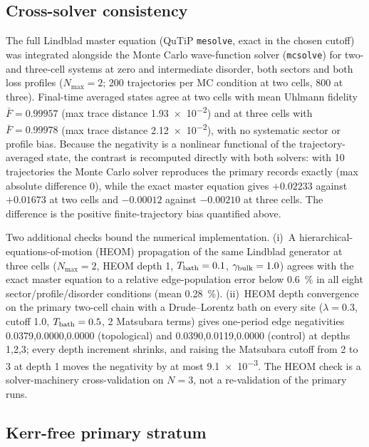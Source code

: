 \documentclass[aps,pra,preprint,superscriptaddress,amsmath,amssymb]{revtex4-2}
\begin{document}
\subsection{Cross-solver consistency}
\label{sec:crosssolver}

The full Lindblad master equation (QuTiP \texttt{mesolve}, exact in the chosen cutoff) was integrated alongside the Monte Carlo wave-function solver (\texttt{mcsolve}) for two- and three-cell systems at zero and intermediate disorder, both sectors and both loss profiles ($N_{\max}=\num{2}$; \num{200} trajectories per MC condition at two cells, \num{800} at three). Final-time averaged states agree at two cells with mean Uhlmann fidelity $\bar{F}=\num{0.99957}$ (max trace distance \num{1.93e-2}) and at three cells with $\bar{F}=\num{0.99978}$ (max trace distance \num{2.12e-2}), with no systematic sector or profile bias. Because the negativity is a nonlinear functional of the trajectory-averaged state, the contrast is recomputed directly with both solvers: with \num{10} trajectories the Monte Carlo solver reproduces the primary records exactly (max absolute difference $\num{0}$), while the exact master equation gives $+\num{0.02233}$ against $+\num{0.01673}$ at two cells and $-\num{0.00012}$ against $-\num{0.00210}$ at three cells. The difference is the positive finite-trajectory bias quantified above.

Two additional checks bound the numerical implementation. (i)~A hierarchical-equations-of-motion (HEOM) propagation of the same Lindblad generator at three cells ($N_{\max}=\num{2}$, HEOM depth \num{1}, $T_{\rm bath}=\num{0.1}$, $\gamma_{\rm bulk}=\num{1.0}$) agrees with the exact master equation to a relative edge-population error below \qty{0.6}{\percent} in all eight sector/profile/disorder conditions (mean \qty{0.28}{\percent}). (ii)~HEOM depth convergence on the primary two-cell chain with a Drude--Lorentz bath on every site ($\lambda=\num{0.3}$, cutoff \num{1.0}, $T_{\rm bath}=\num{0.5}$, \num{2} Matsubara terms) gives one-period edge negativities \num{0.0379},\num{0.0000},\num{0.0000} (topological) and \num{0.0390},\num{0.0119},\num{0.0000} (control) at depths \num{1},\num{2},\num{3}; every depth increment shrinks, and raising the Matsubara cutoff from \num{2} to \num{3} at depth \num{1} moves the negativity by at most \num{9.1e-3}. The HEOM check is a solver-machinery cross-validation on $N=\num{3}$, not a re-validation of the primary runs.

\subsection{Kerr-free primary stratum}
\label{sec:kerrfree}
\end{document}
